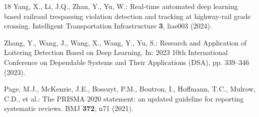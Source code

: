 \documentclass[runningheads]{llncs}
\begin{document}
\begin{thebibliography}{18}
Yang, X., Li, J.Q., Zhan, Y., Yu, W.: Real-time automated deep learning based railroad trespassing violation detection and tracking at highway-rail grade crossing. Intelligent Transportation Infrastructure \textbf{3}, liae003 (2024). 

Zhang, Y., Wang, J., Wang, X., Wang, Y., Yu, S.: Research and Application of Loitering Detection Based on Deep Learning. In: 2023 10th International Conference on Dependable Systems and Their Applications (DSA), pp. 339--346 (2023). 

Page, M.J., McKenzie, J.E., Bossuyt, P.M., Boutron, I., Hoffmann, T.C., Mulrow, C.D., et al.: The PRISMA 2020 statement: an updated guideline for reporting systematic reviews. BMJ \textbf{372}, n71 (2021). 

\end{thebibliography}
\end{document}
